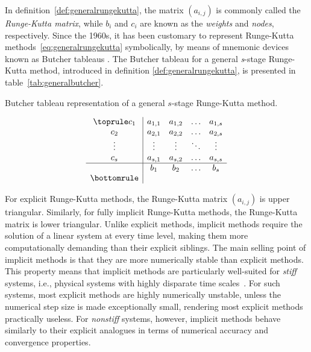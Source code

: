 In definition~\ref{def:generalrungekutta}, the matrix $(a_{i,j})$ is commonly
called the \emph{Runge-Kutta matrix}, while $b_{i}$ and $c_{i}$ are known as
the \emph{weights} and \emph{nodes}, respectively.  Since the 1960s, it has
been customary to represent Runge-Kutta methods~\eqref{eq:generalrungekutta}
symbolically, by means of mnemonic devices known as Butcher tableaus
\parencite[p.134 in the 2008 printing]{hairer1993solving}. The Butcher tableau
for a general \emph{s}-stage Runge-Kutta method, introduced in definition
\ref{def:generalrungekutta}, is presented in table~\ref{tab:generalbutcher}.

\begin{table}[htpb]
    \centering
    \caption[Butcher tableau representation of a general $s$-stage
                Runge-Kutta method]{Butcher tableau representation of a general
                    $s$-stage Runge-Kutta method.}
    \label{tab:generalbutcher}
    \[
        \begin{array}{c|cccc}
            \toprule
            c_{1} & a_{1,1} & a_{1,2} & \ldots & a_{1,s}\\
            c_{2} & a_{2,1} & a_{2,2} & \ldots & a_{2,s}\\
            \vdots & \vdots & \vdots & \ddots & \vdots \\
            c_{s} & a_{s,1} & a_{s,2} & \ldots & a_{s,s}\\
            \hline
            & b_{1} & b_{2} & \ldots & b_{s}\\
            \bottomrule
    \end{array}
\]
\end{table}

For explicit Runge-Kutta methods, the Runge-Kutta matrix $(a_{i,j})$ is upper
triangular. Similarly, for fully implicit Runge-Kutta methods, the Runge-Kutta
matrix is lower triangular. Unlike explicit methods, implicit methods require
the solution of a linear system at every time level, making them more
computationally demanding than their explicit siblings. The main selling point
of implicit methods is that they are more numerically stable than explicit
methods. This property means that implicit methods are particularly well-suited
for \emph{stiff} systems, i.e., physical systems with highly disparate time
scales~\parencite[p.2 in the 2010 printing]{hairer1996solving}. For such systems,
most explicit methods are highly numerically unstable, unless the numerical step
size is made exceptionally small, rendering most explicit methods practically
useless. For \emph{nonstiff} systems, however, implicit methods behave similarly
to their explicit analogues in terms of numerical accuracy and
convergence properties.



